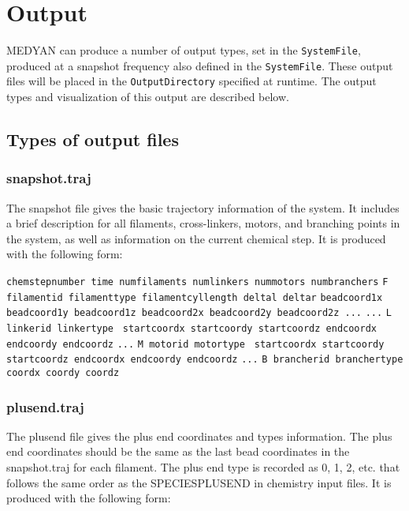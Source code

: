 \documentclass[11pt, oneside]{article}   	%
\begin{document}
\section {Output}

MEDYAN can produce a number of output types, set in the \texttt{SystemFile}, produced at a snapshot frequency also defined in the \texttt{SystemFile}. These output files will be placed in the \texttt{OutputDirectory} specified at runtime. The output types and visualization of this output are described below.

\subsection{Types of output files}
\subsubsection{snapshot.traj}
The snapshot file gives the basic trajectory information of the system. It includes a brief description for all filaments, cross-linkers, motors, and branching points in the system, as well as information on the current chemical step. It is produced with the following form:\newline

\noindent\texttt{chemstepnumber time numfilaments numlinkers nummotors numbranchers}\newline
\texttt{F filamentid filamenttype filamentcyllength deltal deltar}\newline
\texttt{beadcoord1x beadcoord1y beadcoord1z beadcoord2x beadcoord2y beadcoord2z ...}\newline
\texttt{...}\newline
\texttt{L linkerid linkertype }\newline
\texttt{startcoordx startcoordy startcoordz endcoordx endcoordy endcoordz}\newline
\texttt{...}\newline
\texttt{M motorid motortype }\newline
\texttt{startcoordx startcoordy startcoordz endcoordx endcoordy endcoordz}\newline
\texttt{...}\newline
\texttt{B brancherid branchertype }\newline
\texttt{coordx coordy coordz}\newline

\subsubsection{plusend.traj}
The plusend file gives the plus end coordinates and types information. The plus end coordinates should be the same as the last bead coordinates in the snapshot.traj for each filament. The plus end type is recorded as 0, 1, 2, etc. that follows the same order as the SPECIESPLUSEND in chemistry input files. It is produced with the following form:\newline
\end{document}
